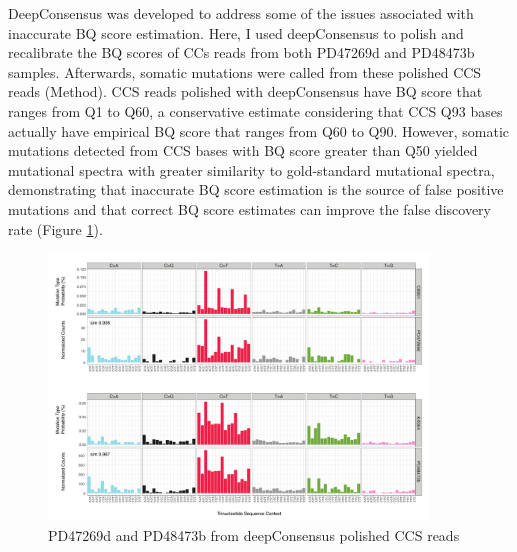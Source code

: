 DeepConsensus \cite{Baid2022-or} was developed to address some of the issues associated with inaccurate BQ score estimation. Here, I used deepConsensus to polish and recalibrate the BQ scores of CCs reads from both PD47269d and PD48473b samples. Afterwards, somatic mutations were called from these polished CCS reads (Method). CCS reads polished with deepConsensus have BQ score that ranges from Q1 to Q60, a conservative estimate considering that CCS Q93 bases actually have empirical BQ score that ranges from Q60 to Q90. However, somatic mutations detected from CCS bases with BQ score greater than Q50 yielded mutational spectra with greater similarity to gold-standard mutational spectra, demonstrating that inaccurate BQ score estimation is the source of false positive mutations and that correct BQ score estimates can improve the false discovery rate (Figure \ref{figure:PD47269d-PD48473b-deepConsensus}). 

\begin{figure}[htbp!]
\caption{PD47269d and PD48473b from deepConsensus polished CCS reads}
\label{figure:PD47269d-PD48473b-deepConsensus}
\includegraphics[width=0.9\textwidth]{Vector/CB001_PD47269d_KX004_PD48473b_deepConsensus.pdf}
\end{figure}


